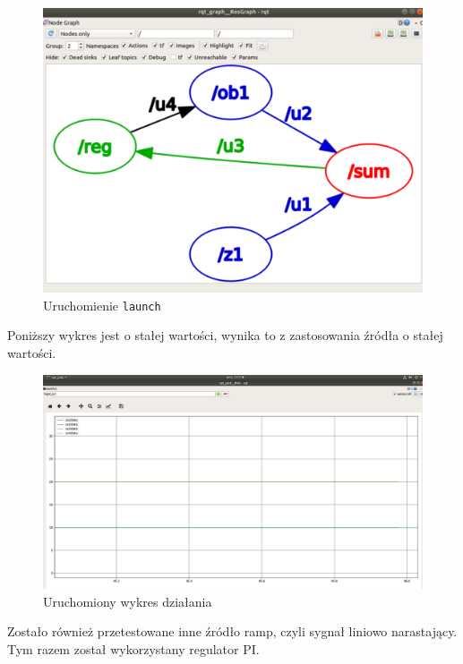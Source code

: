 \documentclass[10pt,a4paper,twoside,twocolumn]{article}%
\begin{document}
\begin{figure}[H]
    \centering
    \includegraphics[width=0.9\linewidth]{image11.png}
    \caption{Uruchomienie \texttt{launch}}
\end{figure}

Poniższy wykres jest o stałej wartości, wynika to z zastosowania źródła o stałej wartości.

\begin{figure}[H]
    \centering
    \includegraphics[width=1\linewidth]{image12.png}
    \caption{Uruchomiony wykres działania}
\end{figure}

Zostało również przetestowane inne źródło ramp, czyli sygnał liniowo narastający. Tym razem został wykorzystany regulator PI.
\end{document}
